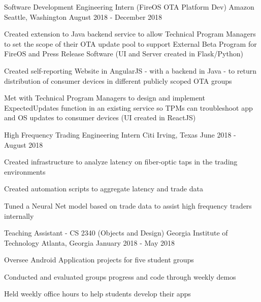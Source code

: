 \documentclass[
    changecolor={0, 38, 58},
]{pranav-resume}
\begin{document}
\cventry
  {Software Development Engineering Intern (FireOS OTA Platform Dev)}
  {Amazon}
  {Seattle, Washington}
  {August 2018 - December 2018}
  {
    \begin{cvitems}
     	 \item {Created extension to Java backend service to allow Technical Program Managers to set the scope of their OTA update pool to support External Beta Program for FireOS and Press Release Software (UI and Server created in Flask/Python) }
	\item {Created self-reporting Website in AngularJS - with a backend in Java - to return distribution of consumer devices in different publicly scoped OTA groups }
	\item {Met with Technical Program Managers to design and implement ExpectedUpdates function in an existing service so TPMs can troubleshoot app and OS updates to consumer devices (UI created in ReactJS)}
    \end{cvitems}
  }
\cventry
  {High Frequency Trading Engineering Intern}
  {Citi}
  {Irving, Texas}
  {June 2018 - August 2018}
  {
    \begin{cvitems}
	\item{Created infrastructure to analyze latency on fiber-optic taps in the trading environments}
	\item{Created automation scripts to aggregate latency and trade data}
	\item{Tuned a Neural Net model based on trade data to assist high frequency traders internally}
    \end{cvitems}
  }
\cventry
  {Teaching Assistant - CS 2340 (Objects and Design)}
  {Georgia Institute of Technology}
  {Atlanta, Georgia}
  {January 2018 - May 2018}
  {
    \begin{cvitems}
      \item {Oversee Android Application projects for five student groups}
      \item {Conducted and evaluated groups progress and code through weekly demos}
      \item{Held weekly office hours to help students develop their apps}
    \end{cvitems}
  }
\end{document}
